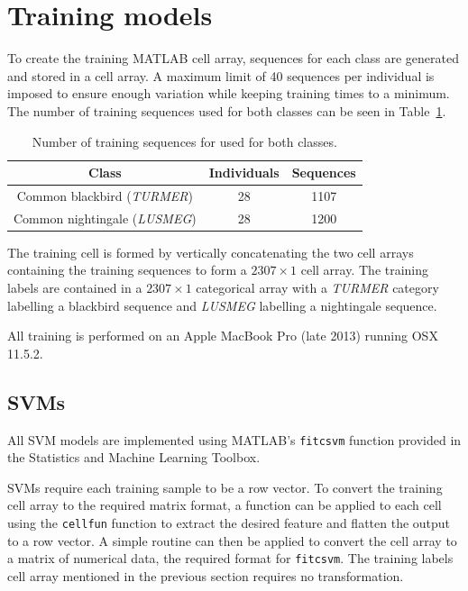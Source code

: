 \section{Training models}\label{sec:training}

To create the training MATLAB cell array, sequences for each class are
generated and stored in a cell array. A maximum limit of 40 sequences per
individual is imposed to ensure enough variation while keeping training times to
a minimum. The number of training sequences used for both classes can be seen in
Table~\ref{table:training_samples}.

\begin{table}[ht]
\begin{center}
\begin{tabular}{c c c}
\toprule
Class & Individuals & Sequences \\ [0.5ex]
\midrule
Common blackbird (\textit{TURMER}) & 28 & 1107 \\
Common nightingale (\textit{LUSMEG}) & 28 & 1200 \\
\bottomrule
\end{tabular}
\caption{Number of training sequences for used for both
classes.}\label{table:training_samples}
\end{center}
\end{table}

The training cell is formed by vertically concatenating the two cell arrays
containing the training sequences to form a $2307 \times 1$ cell array. The
training labels are contained in a $2307 \times 1$ categorical array with a
\textit{TURMER} category labelling a blackbird sequence and \textit{LUSMEG}
labelling a nightingale sequence.

All training is performed on an Apple MacBook Pro (late 2013) running OSX
11.5.2.

\subsection{SVMs}

All SVM models are implemented using MATLAB's \texttt{fitcsvm}
function provided in the Statistics and Machine Learning Toolbox.

SVMs require each training sample to be a row vector. To convert the training
cell array to the required matrix format, a function can be applied to each cell
using the \texttt{cellfun} function to extract the desired feature and flatten
the output to a row vector. A simple routine can then be applied to convert the
cell array to a matrix of numerical data, the required format for
\texttt{fitcsvm}. The training labels cell array mentioned in the previous
section requires no transformation.

